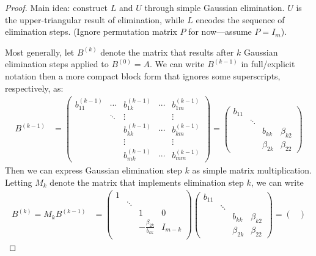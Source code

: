 \documentclass[12pt]{article}
\numberwithin{equation}{section} %
\theoremstyle{plain}
\theoremstyle{definition}
\theoremstyle{remark}
\begin{document}
\begin{proof}%
Main idea:
construct $L$ and $U$ through simple Gaussian elimination.
$U$ is the upper-triangular result of elimination, while
$L$ encodes the sequence of elimination steps.
(Ignore permutation matrix $P$ for now---assume $P=I_m$).

Most generally, let $B^{(k)}$ denote the matrix that results after $k$
Gaussian elimination steps applied to $B^{(0)}=A$. We can write
$B^{(k-1)}$ in full/explicit notation then a more compact block form
that ignores some superscripts, respectively, as:
\begin{align*}
  B^{(k-1)}
  &=
  \begin{pmatrix}
    b_{11}^{(k-1)} & \cdots & b_{1k}^{(k-1)} & \cdots & b_{1m}^{(k-1)}\\
    & \ddots & \vdots  & & \vdots\\
    & & b_{kk}^{(k-1)} & \cdots & b_{km}^{(k-1)} \\
    & & \vdots & & \vdots \\
    & & b_{mk}^{(k-1)} & \cdots & b_{mm}^{(k-1)}
  \end{pmatrix}
  =
  \begin{pmatrix}
    b_{11} & \\
    & \ddots &  & \\
    & & b_{kk} & \beta_{k2} \\
    & & \beta_{2k} & \beta_{22}
  \end{pmatrix}
\end{align*}
Then we can express Gaussian elimination step $k$ as simple matrix
multiplication. Letting $M_k$ denote the matrix that implements
elimination step $k$, we can write
\begin{align*}
  B^{(k)} = M_k B^{(k-1)}
  &=
  \begin{pmatrix}
    1 & \\
      & \ddots & & \\
      &  & 1 & 0 \\
      &  & -\frac{\beta_{2k}}{b_{kk}} & I_{m-k}\\
  \end{pmatrix}
  \begin{pmatrix}
    b_{11} & \\
    & \ddots &  & \\
    & & b_{kk} & \beta_{k2} \\
    & & \beta_{2k} & \beta_{22}
  \end{pmatrix}
  =
  \begin{pmatrix}

\end{pmatrix}
\end{align*}
\end{proof}
\end{document}
